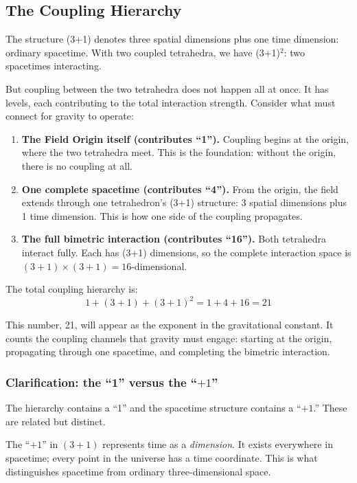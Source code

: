 \documentclass[aps,prd,preprint,superscriptaddress,showpacs,preprintnumbers,amsmath,amssymb,nofootinbib]{revtex4-2}
\begin{document}
\subsection{The Coupling Hierarchy}
\label{subsec:hierarchy}

The structure (3+1) denotes three spatial dimensions plus one time dimension: ordinary spacetime. With two coupled tetrahedra, we have (3+1)$^2$: two spacetimes interacting.

But coupling between the two tetrahedra does not happen all at once. It has levels, each contributing to the total interaction strength. Consider what must connect for gravity to operate:

\begin{enumerate}
\item \textbf{The Field Origin itself (contributes ``1'').} Coupling begins at the origin, where the two tetrahedra meet. This is the foundation: without the origin, there is no coupling at all.
\item \textbf{One complete spacetime (contributes ``4'').} From the origin, the field extends through one tetrahedron's (3+1) structure: 3 spatial dimensions plus 1 time dimension. This is how one side of the coupling propagates.
\item \textbf{The full bimetric interaction (contributes ``16'').} Both tetrahedra interact fully. Each has (3+1) dimensions, so the complete interaction space is $(3+1) \times (3+1) = 16$-dimensional.
\end{enumerate}

The total coupling hierarchy is:
\begin{equation}
1 + (3+1) + (3+1)^2 = 1 + 4 + 16 = 21
\label{eq:hierarchy}
\end{equation}

This number, 21, will appear as the exponent in the gravitational constant. It counts the coupling channels that gravity must engage: starting at the origin, propagating through one spacetime, and completing the bimetric interaction.

\subsubsection*{Clarification: the ``1'' versus the ``$+1$''}

The hierarchy contains a ``1'' and the spacetime structure contains a ``$+1$.'' These are related but distinct.

The ``$+1$'' in $(3+1)$ represents time as a \emph{dimension}. It exists everywhere in spacetime; every point in the universe has a time coordinate. This is what distinguishes spacetime from ordinary three-dimensional space.
\end{document}
